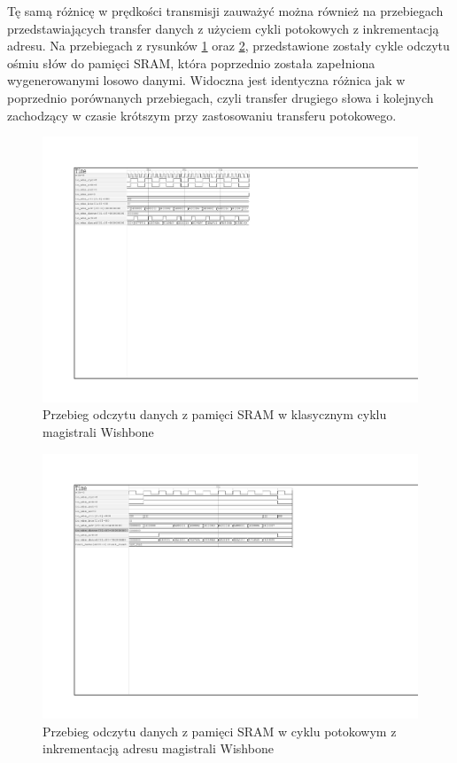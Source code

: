 Tę samą różnicę w prędkości transmisji zauważyć można również na przebiegach przedstawiających transfer danych z użyciem cykli potokowych z inkrementacją adresu. Na przebiegach z rysunków \ref{fig:test-sram-classic-8} oraz \ref{fig:test-sram-increment-8}, przedstawione zostały cykle odczytu ośmiu słów do pamięci SRAM, która poprzednio została zapełniona wygenerowanymi losowo danymi.
Widoczna jest identyczna różnica jak w poprzednio porównanych przebiegach, czyli transfer drugiego słowa i kolejnych zachodzący w czasie krótszym przy zastosowaniu transferu potokowego.

\begin{figure}[H]
	\centering
	\includegraphics[scale=1,trim={2.54cm 14cm 13.4cm 2.9cm},clip]{testing/test-sram-classic-8.pdf}
	\caption{Przebieg odczytu danych z pamięci SRAM w klasycznym cyklu magistrali Wishbone}
	\label{fig:test-sram-classic-8}
\end{figure}

\begin{figure}[H]
	\centering
	\includegraphics[scale=1,trim={2.54cm 14cm 11.2cm 2.9cm},clip]{testing/test-sram-increment-8.pdf}
	\caption{Przebieg odczytu danych z pamięci SRAM w cyklu potokowym z inkrementacją adresu magistrali Wishbone}
	\label{fig:test-sram-increment-8}
\end{figure}


